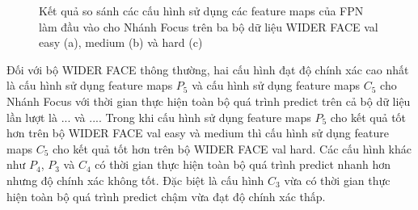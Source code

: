 {    \begin{figure}[H]
        \centering
        \caption{Kết quả so sánh các cấu hình sử dụng các feature maps  của FPN làm đầu vào cho Nhánh Focus  trên ba bộ dữ liệu WIDER FACE val easy (a), medium (b) và hard (c)}
        \label{fig:retinafocus_widerface_val_fpn}
    \end{figure}

    \noindent
    Đối với bộ WIDER FACE thông thường, hai cấu hình đạt độ chính xác cao nhất là cấu hình sử dụng feature maps  ${P}_{5}$ và cấu hình sử dụng feature maps  ${C}_{5}$ cho Nhánh Focus  với thời gian thực hiện toàn bộ quá trình predict trên cả bộ dữ liệu lần lượt là ... và ....
    Trong khi cấu hình sử dụng feature maps  ${P}_{5}$ cho kết quả tốt hơn trên bộ WIDER FACE val easy và medium thì cấu hình sử dụng feature maps  ${C}_{5}$ cho kết quả tốt hơn trên bộ WIDER FACE val hard.
    Các cấu hình khác như ${P}_{4}$, ${P}_{3}$ và ${C}_{4}$ có thời gian thực hiện toàn bộ quá trình predict nhanh hơn nhưng độ chính xác không tốt.
    Đặc biệt là cấu hình ${C}_{3}$ vừa có thời gian thực hiện toàn bộ quá trình predict chậm vừa đạt độ chính xác thấp.

}
